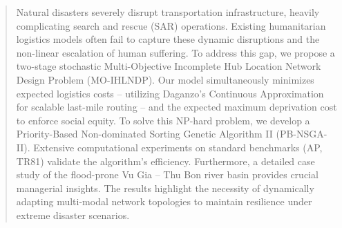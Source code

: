 \documentclass{llncs}
\begin{document}
\begin{abstract}

Natural disasters severely disrupt transportation infrastructure, heavily complicating search and rescue (SAR) operations. Existing humanitarian logistics models often fail to capture these dynamic disruptions and the non-linear escalation of human suffering. To address this gap, we propose a two-stage stochastic Multi-Objective Incomplete Hub Location Network Design Problem (MO-IHLNDP). Our model simultaneously minimizes expected logistics costs -- utilizing Daganzo's Continuous Approximation for scalable last-mile routing -- and the expected maximum deprivation cost to enforce social equity. To solve this NP-hard problem, we develop a Priority-Based Non-dominated Sorting Genetic Algorithm II (PB-NSGA-II). Extensive computational experiments on standard benchmarks (AP, TR81) validate the algorithm's efficiency. Furthermore, a detailed case study of the flood-prone Vu Gia -- Thu Bon river basin provides crucial managerial insights. The results highlight the necessity of dynamically adapting multi-modal network topologies to maintain resilience under extreme disaster scenarios.
\end{abstract}
\end{document}
